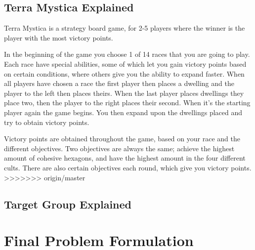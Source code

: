 \subsection{Terra Mystica Explained}

Terra Mystica is a strategy board game, for 2-5 players where the winner is the player with the most victory points. 

In the beginning of the game you choose 1 of 14 races that you are going to play. Each race have special abilities, some of which let you gain victory points based on certain conditions, where others give you the ability to expand faster. When all players have chosen a race the first player then places a dwelling and the player to the left then places theirs. When the last player places dwellings they place two, then the player to the right places their second. When it's the starting player again the game begins. You then expand upon the dwellings placed and try to obtain victory points.

Victory points are obtained throughout the game, based on your race and the different objectives. Two objectives are always the same; achieve the highest amount of cohesive hexagons, and have the highest amount in the four different cults. There are also certain objectives each round, which give you victory points. 
>>>>>>> origin/master

\subsection{Target Group Explained}

\section{Final Problem Formulation}\label{sec:finalprob}

